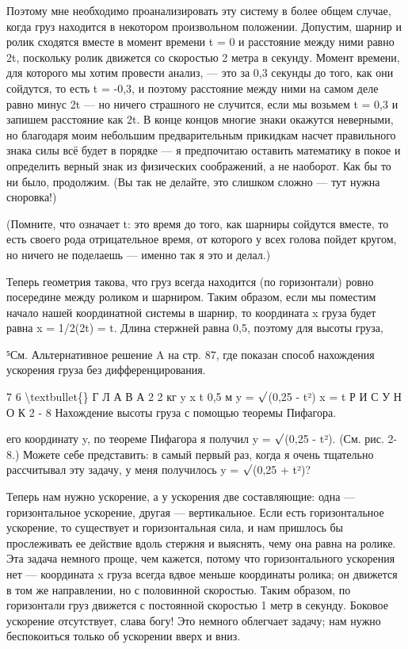 \documentclass[10pt,oneside]{article}
\begin{document}
Поэтому мне необходимо проанализировать эту систему в более общем случае, когда груз находится в некотором произвольном положении. Допустим, шарнир и ролик сходятся вместе в момент времени t = 0 и расстояние между ними равно 2t, поскольку ролик движется со скоростью 2 метра в секунду. Момент времени, для которого мы хотим провести анализ, --- это за 0,3 секунды до того, как они сойдутся, то есть t = -0,3, и поэтому расстояние между ними на самом деле равно минус 2t --- но ничего страшного не случится, если мы возьмем t = 0,3 и запишем расстояние как 2t. В конце концов многие знаки окажутся неверными, но благодаря моим небольшим предварительным прикидкам насчет правильного знака силы всё будет в порядке --- я предпочитаю оставить математику в покое и определить верный знак из физических соображений, а не наоборот. Как бы то ни было, продолжим. (Вы так не делайте, это слишком сложно --- тут нужна сноровка!)\par

(Помните, что означает t: это время до того, как шарниры сойдутся вместе, то есть своего рода отрицательное время, от которого у всех голова пойдет кругом, но ничего не поделаешь --- именно так я это и делал.)\par

Теперь геометрия такова, что груз всегда находится (по горизонтали) ровно посередине между роликом и шарниром. Таким образом, если мы поместим начало нашей координатной системы в шарнир, то координата x груза будет равна x = 1/2(2t) = t. Длина стержней равна 0,5, поэтому для высоты груза,\par

⁵См. Альтернативное решение A на стр. 87, где показан способ нахождения ускорения груза без дифференцирования.\par

7 6 \textbackslash{}textbullet\{\} Г Л А В А  2 2 кг y x t 0,5 м y = \ensuremath{\sqrt{\vphantom{1}}}(0,25 - t²) x = t Р И С У Н О К 2 - 8 Нахождение высоты груза с помощью теоремы Пифагора.\par

его координату y, по теореме Пифагора я получил y = \ensuremath{\sqrt{\vphantom{1}}}(0,25 - t²). (См. рис. 2-8.) Можете себе представить: в самый первый раз, когда я очень тщательно рассчитывал эту задачу, у меня получилось y = \ensuremath{\sqrt{\vphantom{1}}}(0,25 + t²)?\par

Теперь нам нужно ускорение, а у ускорения две составляющие: одна --- горизонтальное ускорение, другая --- вертикальное. Если есть горизонтальное ускорение, то существует и горизонтальная сила, и нам пришлось бы прослеживать ее действие вдоль стержня и выяснять, чему она равна на ролике. Эта задача немного проще, чем кажется, потому что горизонтального ускорения нет --- координата x груза всегда вдвое меньше координаты ролика; он движется в том же направлении, но с половинной скоростью. Таким образом, по горизонтали груз движется с постоянной скоростью 1 метр в секунду. Боковое ускорение отсутствует, слава богу! Это немного облегчает задачу; нам нужно беспокоиться только об ускорении вверх и вниз.\par
\end{document}
